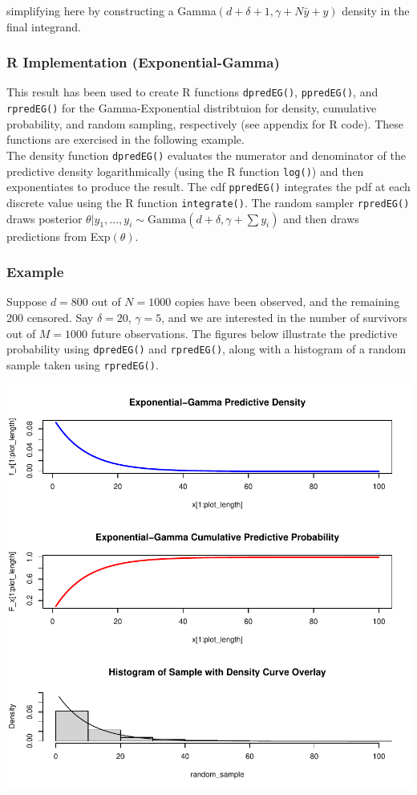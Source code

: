\documentclass[12pt, a4paper]{article}
\begin{document}
\noindent simplifying here by constructing a Gamma$(d+\delta+1,\gamma+N\bar{y}+y)$ density in the final integrand.\\



    \subsubsection{R Implementation (Exponential-Gamma)}

This result has been used to create R functions \texttt{dpredEG()}, \texttt{ppredEG()}, and \texttt{rpredEG()} for the Gamma-Exponential distribtuion for density, cumulative probability, and random sampling, respectively (see appendix for R code).  These functions are exercised in the following example. \\

The density function \texttt{dpredEG()} evaluates the numerator and denominator of the predictive density logarithmically (using the R function \texttt{log()}) and then exponentiates to produce the result.  The cdf \texttt{ppredEG()} integrates the pdf at each discrete value using the R function \texttt{integrate()}.  The random sampler \texttt{rpredEG()} draws posterior $\theta|y_1,...,y_i\sim\text{Gamma}(d+\delta,\gamma+\sum y_i)$ and then draws predictions from Exp$(\theta)$.


    \subsubsection{Example}

Suppose $d=800$ out of $N = 1000$ copies have been observed, and the remaining $200$ censored.  Say $\delta = 20$, $\gamma=5$, and we are interested in the number of survivors out of $M = 1000$ future observations.  The figures below illustrate the predictive probability using \texttt{dpredEG()} and \texttt{rpredEG()}, along with a histogram of a random sample taken using \texttt{rpredEG()}.


\includegraphics{Thesis_v3-004}
\end{document}
